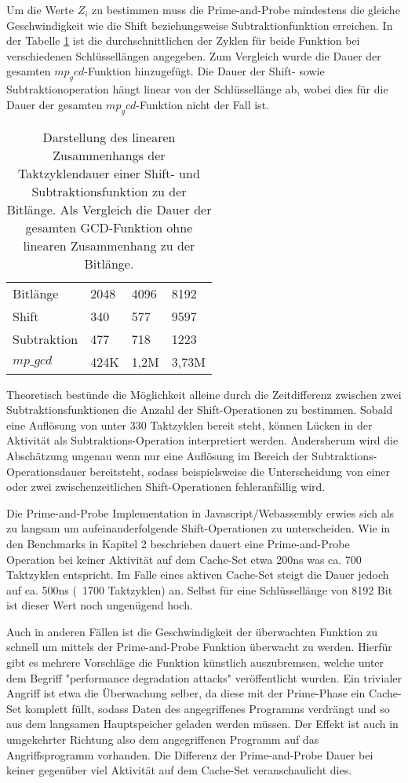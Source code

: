 Um die Werte $Z_i$ zu bestimmen muss die Prime-and-Probe mindestens die gleiche Geschwindigkeit wie die Shift beziehungsweise Subtraktionfunktion erreichen.
In der Tabelle \ref{tbl:ShiftSubCycles} ist die durchschnittlichen der Zyklen für beide Funktion bei verschiedenen Schlüssellängen angegeben. Zum Vergleich wurde die Dauer der gesamten $mp_gcd$-Funktion hinzugefügt.
Die Dauer der Shift- sowie Subtraktionoperation hängt linear von der Schlüssellänge ab, wobei dies für die Dauer der gesamten $mp_gcd$-Funktion nicht der Fall ist.

\begin{table}[h]
\label{tbl:ShiftSubCycles}
\caption{Darstellung des linearen Zusammenhangs der Taktzyklendauer einer Shift- und Subtraktionsfunktion zu der Bitlänge. Als Vergleich die Dauer der gesamten GCD-Funktion ohne linearen Zusammenhang zu der Bitlänge. }
\begin{tabular}{llll}
Bitlänge    & 2048 & 4096 & 8192 \\
Shift       & 340  & 577  & 9597 \\
Subtraktion & 477  & 718  & 1223 \\
$mp\_gcd$    & 424K & 1,2M & 3,73M
\end{tabular}
\end{table}

Theoretisch bestünde die Möglichkeit alleine durch die Zeitdifferenz zwischen zwei Subtraktionsfunktionen die Anzahl der Shift-Operationen zu bestimmen.
Sobald eine Auflösung von unter 330 Taktzyklen bereit steht, können Lücken in der Aktivität als Subtraktions-Operation interpretiert werden.
Andersherum wird die Abschätzung ungenau wenn nur eine Auflösung im Bereich der Subtraktions-Operationsdauer bereitsteht, sodass beispielsweise die Unterscheidung von einer oder zwei zwischenzeitlichen Shift-Operationen fehleranfällig wird.

Die Prime-and-Probe Implementation in Javascript/Webassembly erwies sich als zu langsam um aufeinanderfolgende Shift-Operationen zu unterscheiden.
Wie in den Benchmarks in Kapitel 2 beschrieben dauert eine Prime-and-Probe Operation bei keiner Aktivität auf dem Cache-Set etwa 200ns was ca. 700 Taktzyklen entspricht.
Im Falle eines aktiven Cache-Set steigt die Dauer jedoch auf ca. 500ns (~1700 Taktzyklen) an.
Selbst für eine Schlüssellänge von 8192 Bit ist dieser Wert noch ungenügend hoch.

Auch in anderen Fällen ist die Geschwindigkeit der überwachten Funktion zu schnell um mittels der Prime-and-Probe Funktion überwacht zu werden.
Hierfür gibt es mehrere Vorschläge die Funktion künstlich auszubremsen, welche unter dem Begriff "performance degradation attacks" veröffentlicht wurden. 
Ein trivialer Angriff ist etwa die Überwachung selber, da diese mit der Prime-Phase ein Cache-Set komplett füllt, sodass Daten des angegriffenes Programms verdrängt und so aus dem langsamen Hauptspeicher geladen werden müssen.
Der Effekt ist auch in umgekehrter Richtung also dem angegriffenen Programm auf das Angriffsprogramm vorhanden.
Die Differenz der Prime-and-Probe Dauer bei keiner gegenüber viel Aktivität auf dem Cache-Set veranschaulicht dies.

